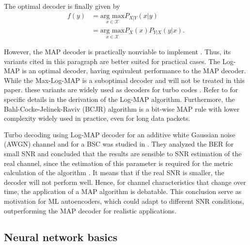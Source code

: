 \documentclass[conference]{IEEEtran}
\begin{document}
The optimal decoder is finally given by
\begin{align}
f(y) &= \underset{x\in \mathcal{X}}{\text{arg max}} P_{X|Y}(x|y)\label{eq:MAPF1}\\
&= \underset{x\in \mathcal{X}}{\text{arg max}}
P_X(x)P_{Y|X}(y|x).\label{eq:MAPF2}
\end{align}

However, the MAP decoder is practically nonviable to implement \cite{b6}. Thus, its variants cited in this paragraph are better suited for practical cases. The Log-MAP is an optimal decoder, having equivalent performance to the MAP decoder. While the Max-Log-MAP is a suboptimal decoder and will not be treated in this paper.  these variants are widely used as decoders for turbo codes \cite{b7}. Refer to \cite{b6} for specific details in the derivation of the Log-MAP algorithm. Furthermore, the Bahl-Cocke-Jelinek-Raviv (BCJR) algorithm is a bit-wise MAP rule with lower complexity widely used in practice, even for long data packets.

Turbo decoding using Log-MAP decoder for an additive white Gaussian noise (AWGN) channel and for a BSC was studied in \cite{b5}. They analyzed the BER for small SNR and concluded that the results are sensible to SNR estimation of the real channel, since the estimation of this parameter is required for the metric calculation of the algorithm \cite{b6}. It means that if the real SNR is smaller, the decoder will not perform well. Hence, for channel characteristics that change over time, the application of a MAP algorithm is debatable. This conclusion serve as motivation for ML autoencoders, which could adapt to different SNR conditions, outperforming the MAP decoder for realistic applications.

\subsection{Neural network basics}

\end{document}
